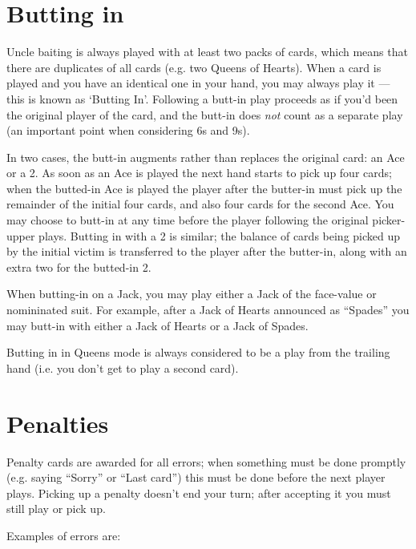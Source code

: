 \documentclass[12pt]{article}
\begin{document}
\section{Butting in}
\label{buttingIn}

Uncle baiting is always played with at least two packs of cards, which means that there
are duplicates of all cards (e.g. two Queens of Hearts).  When a card is played and you
have an identical one in your hand, you may always play it --- this is known as `Butting In'.
Following a butt-in play proceeds as if you'd been the original player of the card, and
the butt-in does \emph{not} count as a separate play (an important point when considering
6s and 9s).

In two cases, the butt-in augments rather than replaces the original card:
an Ace or a 2.  As soon as an Ace is played the next hand starts to pick up
four cards;  when the butted-in Ace is played the player after the butter-in
must pick up the remainder of the initial four cards, and also four cards for
the second Ace.  You may choose to butt-in at any time before the player following
the original picker-upper plays.   Butting in with a 2 is similar;  the balance
of cards being picked up by the initial victim is transferred to the player
after the butter-in, along with an extra two for the butted-in 2.

When butting-in on a Jack, you may play either a Jack of the face-value or nomininated suit. For
example, after a Jack of Hearts announced as ``Spades'' you may butt-in with either
a Jack of Hearts or a Jack of Spades.

Butting in in Queens mode is always considered to be a play from the trailing hand (i.e. you
don't get to play a second card).

\section{Penalties}
\label{penalties}

Penalty cards are awarded for all errors;  when something must be done promptly (e.g. saying ``Sorry'' or
``Last card'') this must be done before the next player plays.  Picking up a penalty doesn't
end your turn;  after accepting it you must still play or pick up.

Examples of errors are:
\end{document}
